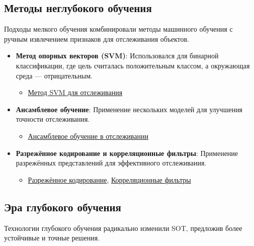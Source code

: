 \subsection*{Методы неглубокого обучения}
Подходы мелкого обучения комбинировали методы машинного обучения с ручным извлечением признаков для отслеживания объектов.

\begin{itemize}
    \item \textbf{Метод опорных векторов (SVM)}: Использовался для бинарной классификации, где цель считалась положительным классом, а окружающая среда — отрицательным.
    \begin{itemize}
        \item \href{https://arxiv.org/pdf/1305.7352.pdf}{Метод SVM для отслеживания}
    \end{itemize}
    \item \textbf{Ансамблевое обучение}: Применение нескольких моделей для улучшения точности отслеживания.
    \begin{itemize}
        \item \href{https://arxiv.org/pdf/1706.07809.pdf}{Ансамблевое обучение в отслеживании}
    \end{itemize}
    \item \textbf{Разрежённое кодирование и корреляционные фильтры}: Применение разрежённых представлений для эффективного отслеживания.
    \begin{itemize}
        \item \href{https://www.sciencedirect.com/science/article/pii/S0031320317301141}{Разрежённое кодирование}, \href{https://arxiv.org/pdf/1707.00469.pdf}{Корреляционные фильтры}
    \end{itemize}
\end{itemize}

\subsection{Эра глубокого обучения}
Технологии глубокого обучения радикально изменили SOT, предложив более устойчивые и точные решения.

